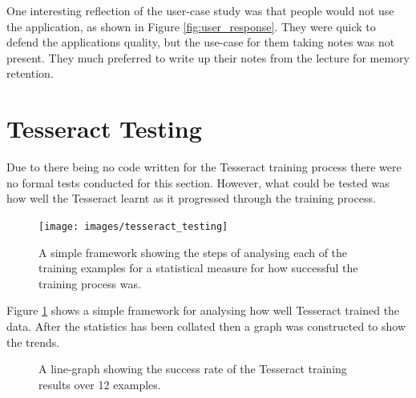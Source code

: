 One interesting reflection of the user-case study was that people would not use the application, as shown in Figure \ref{fig:user_response}. They were quick to defend the applications quality, but the use-case for them taking notes was not present. They much preferred to write up their notes from the lecture for memory retention.

\section{Tesseract Testing}
Due to there being no code written for the Tesseract training process there were no formal tests conducted for this section. However, what could be tested was how well the Tesseract learnt as it progressed through the training process.

\begin{figure}[h!]
  \centering
  \texttt{[image: images/tesseract\_testing]}
  \caption{A simple framework showing the steps of analysing each of the training examples for a statistical measure for how successful the training process was.}
  \label{fig:tesseract_framework}
\end{figure}

Figure \ref{fig:tesseract_framework} shows a simple framework for analysing how well Tesseract trained the data. After the statistics has been collated then a graph was constructed to show the trends.

\begin{figure}[h!]
  \centering
{}
\caption{A line-graph showing the success rate of the Tesseract training results over 12 examples.}
\label{fig:tesseract_graph}
\end{figure}

